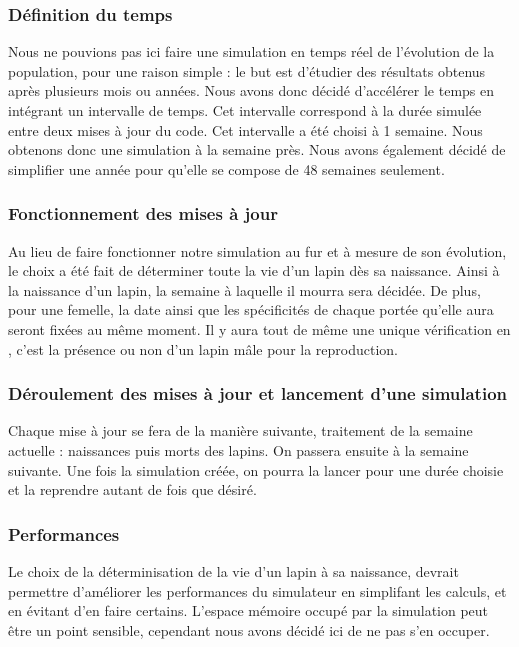 \documentclass[11)pt,a4paper]{article}
\begin{document}
        \subsubsection{Définition du temps}
            Nous ne pouvions pas ici faire une simulation en temps réel de l'évolution de la population, pour une raison simple : le but est d'étudier des résultats obtenus après plusieurs mois ou années.
            Nous avons donc décidé d'accélérer le temps en intégrant un intervalle de temps. Cet intervalle correspond à la durée simulée entre deux mises à jour du code. Cet intervalle a été choisi à 1 semaine.
            Nous obtenons donc une simulation  à la semaine près. Nous avons également décidé de simplifier une année pour qu'elle se compose de 48 semaines seulement. 
        \subsubsection{Fonctionnement des mises à jour}
            Au lieu de faire fonctionner notre simulation au fur et à mesure de son évolution, le choix a été fait de déterminer toute la vie d'un lapin dès sa naissance.
            Ainsi à la naissance d'un lapin, la semaine à laquelle il mourra sera décidée. De plus, pour une femelle, la date ainsi que les spécificités de chaque portée qu'elle aura seront fixées au même moment.
            Il y aura tout de même une unique vérification en , c'est la présence ou non d'un lapin mâle pour la reproduction.
        \subsubsection{Déroulement des mises à jour et lancement d'une simulation}
            Chaque mise à jour se fera de la manière suivante, traitement de la semaine actuelle : naissances puis morts des lapins. On passera ensuite à la semaine suivante.
            Une fois la simulation créée, on pourra la lancer pour une durée choisie et la reprendre autant de fois que désiré.
        \subsubsection{Performances}
            Le choix de la déterminisation de la vie d'un lapin à sa naissance, devrait permettre d'améliorer les performances du simulateur en simplifant les calculs, et en évitant d'en faire certains.
            L'espace mémoire occupé par la simulation peut être un point sensible, cependant nous avons décidé ici de ne pas s'en occuper.
\end{document}
